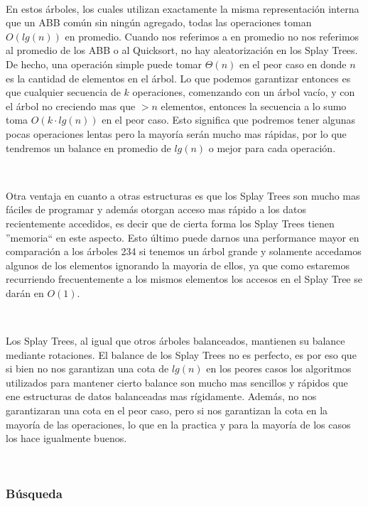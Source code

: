 \documentclass[10pt, a4paper]{report}
\begin{document}
~

En estos \'arboles, los cuales utilizan exactamente la misma representaci\'on interna que un ABB com\'un sin ning\'un agregado, todas las operaciones toman $O(lg(n))$ en promedio. Cuando nos referimos a en promedio no nos referimos al promedio de los ABB o al Quicksort, no hay aleatorizaci\'on en los Splay Trees. De hecho, una operaci\'on simple puede tomar $\Theta(n)$ en el peor caso en donde $n$ es la cantidad de elementos en el \'arbol. Lo que podemos garantizar entonces es que cualquier secuencia de $k$ operaciones, comenzando con un \'arbol vac\'io, y con el \'arbol no creciendo mas que $>n$ elementos, entonces la secuencia a lo sumo toma $O(k\cdot lg(n))$ en el peor caso. Esto significa que podremos tener algunas pocas operaciones lentas pero la mayor\'ia ser\'an mucho mas r\'apidas, por lo que tendremos un balance en promedio de $lg(n)$ o mejor para cada operaci\'on.

~

Otra ventaja en cuanto a otras estructuras es que los Splay Trees son mucho mas f\'aciles de programar y adem\'as otorgan acceso mas r\'apido a los datos recientemente accedidos, es decir que de cierta forma los Splay Trees tienen ''memoria`` en este aspecto. Esto \'ultimo puede darnos una performance mayor en comparaci\'on a los \'arboles 234 si tenemos un \'arbol grande y solamente accedamos algunos de los elementos ignorando la mayoria de ellos, ya que como estaremos recurriendo frecuentemente a los mismos elementos los accesos en el Splay Tree se dar\'an en $O(1)$.

~

Los Splay Trees, al igual que otros \'arboles balanceados, mantienen su balance mediante rotaciones. El balance de los Splay Trees no es perfecto, es por eso que si bien no nos garantizan una cota de $lg(n)$ en los peores casos los algoritmos utilizados para mantener cierto balance son mucho mas sencillos y r\'apidos que ene estructuras de datos balanceadas mas r\'igidamente. Adem\'as, no nos garantizaran una cota en el peor caso, pero si nos garantizan la cota en la mayor\'ia de las operaciones, lo que en la practica y para la mayor\'ia de los casos los hace igualmente buenos.

~

\subsubsection{B\'usqueda}
\end{document}
